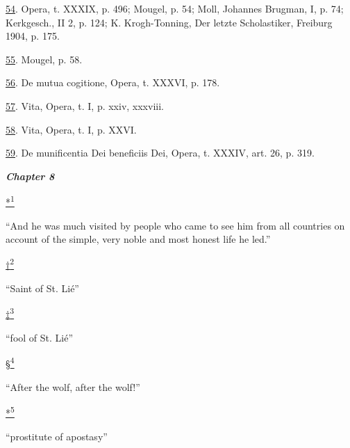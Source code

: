 \protect\hypertarget{23_NOTES.xhtmlux5cux23id_918}{\protect\hyperlink{14_Chapter_Seven__THE_PIOUS_PERSONA.xhtmlux5cux23id_917}{54}}.
Opera, t. XXXIX, p. 496; Mougel, p. 54; Moll, Johannes Brugman, I, p.
74; Kerkgesch., II 2, p. 124; K. Krogh-Tonning, Der letzte Scholastiker,
Freiburg 1904, p. 175.

\protect\hypertarget{23_NOTES.xhtmlux5cux23id_916}{\protect\hyperlink{14_Chapter_Seven__THE_PIOUS_PERSONA.xhtmlux5cux23id_915}{55}}.
Mougel, p. 58.

\protect\hypertarget{23_NOTES.xhtmlux5cux23id_914}{\protect\hyperlink{14_Chapter_Seven__THE_PIOUS_PERSONA.xhtmlux5cux23id_913}{56}}.
De mutua cogitione, Opera, t. XXXVI, p. 178.

\protect\hypertarget{23_NOTES.xhtmlux5cux23id_912}{\protect\hyperlink{14_Chapter_Seven__THE_PIOUS_PERSONA.xhtmlux5cux23id_911}{57}}.
Vita, Opera, t. I, p. xxiv, xxxviii.

\protect\hypertarget{23_NOTES.xhtmlux5cux23id_910}{\protect\hyperlink{14_Chapter_Seven__THE_PIOUS_PERSONA.xhtmlux5cux23id_909}{58}}.
Vita, Opera, t. I, p. XXVI.

\protect\hypertarget{23_NOTES.xhtmlux5cux23id_908}{\protect\hyperlink{14_Chapter_Seven__THE_PIOUS_PERSONA.xhtmlux5cux23id_907}{59}}.
De munificentia Dei beneficiis Dei, Opera, t. XXXIV, art. 26, p. 319.

\textbf{\emph{Chapter 8}}

\protect\hypertarget{23_NOTES.xhtmlux5cux23id_2564}{\protect\hyperlink{15_Chapter_Eight__RELIGIOUS_EXCITAT.xhtmlux5cux23id_2563}{*\textsuperscript{1}}}
``And he was much visited by people who came to see him from all
countries on account of the simple, very noble and most honest life he
led.''

\protect\hypertarget{23_NOTES.xhtmlux5cux23id_2566}{\protect\hyperlink{15_Chapter_Eight__RELIGIOUS_EXCITAT.xhtmlux5cux23id_2565}{†\textsuperscript{2}}}
``Saint of St. Lié''

\protect\hypertarget{23_NOTES.xhtmlux5cux23id_2568}{\protect\hyperlink{15_Chapter_Eight__RELIGIOUS_EXCITAT.xhtmlux5cux23id_2567}{‡\textsuperscript{3}}}
``fool of St. Lié''

\protect\hypertarget{23_NOTES.xhtmlux5cux23id_2570}{\protect\hyperlink{15_Chapter_Eight__RELIGIOUS_EXCITAT.xhtmlux5cux23id_2569}{§\textsuperscript{4}}}
``After the wolf, after the wolf!''

\protect\hypertarget{23_NOTES.xhtmlux5cux23id_2572}{\protect\hyperlink{15_Chapter_Eight__RELIGIOUS_EXCITAT.xhtmlux5cux23id_2571}{*\textsuperscript{5}}}
``prostitute of apostasy''

